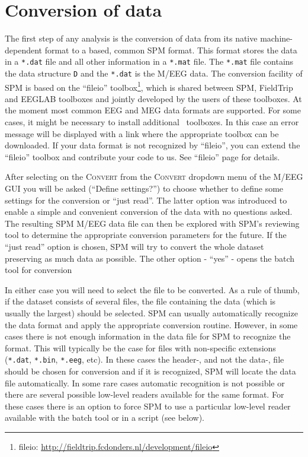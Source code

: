 \section{Conversion of data}
The first step of any analysis is the conversion of data from its native machine-dependent format to a \matlab\-based, common SPM format. This format stores the data in a \texttt{*.dat} file and all other information in a \texttt{*.mat} file. The \texttt{*.mat} file contains the data structure \texttt{D} and the \texttt{*.dat} is the M/EEG data. The conversion facility of SPM is based on the ``fileio'' toolbox\footnote{fileio: \url{http://fieldtrip.fcdonders.nl/development/fileio}}, which is shared between SPM, FieldTrip and EEGLAB toolboxes and jointly developed by the users of these toolboxes. At the moment most common EEG and MEG data formats are supported. For some cases, it might be necessary to install additional \matlab\ toolboxes. In this case an error message will be displayed with a link where the appropriate toolbox can be downloaded. If your data format is not recognized by ``fileio'',  you can extend the ``fileio'' toolbox and contribute your code to us. See ``fileio'' page for details.

After selecting  on the \textsc{Convert} from the \textsc{Convert} dropdown menu of the M/EEG GUI you will be asked (``Define settings?'') to choose whether to define some settings for the conversion or ``just read''. The latter option was introduced to enable a simple and convenient conversion of the data with no questions asked.  The resulting SPM M/EEG data file can then be explored with SPM's reviewing tool to determine the appropriate conversion parameters for the future. If the ``just read'' option is chosen, SPM will try to convert the whole dataset preserving as much data as possible. The other option - ``yes'' - opens the batch tool for conversion

In either case you will need to select the file to be converted. As a rule of thumb, if the dataset consists of several files, the file containing the data (which is usually the largest) should be selected. SPM can usually automatically recognize the data format and apply the appropriate conversion routine. However, in some cases there is not enough information in the data file for SPM to recognize the format. This will typically be the case for files with non-specific extensions (\texttt{*.dat}, \texttt{*.bin}, \texttt{*.eeg}, etc). In these cases the header-, and not the data-, file should be chosen for conversion and if it is recognized, SPM will locate the data file automatically. In some rare cases automatic recognition is not possible or there are several possible low-level readers available for the same format. For these cases there is an option to force SPM to use a particular low-level reader available with the batch tool or in a script (see below).

